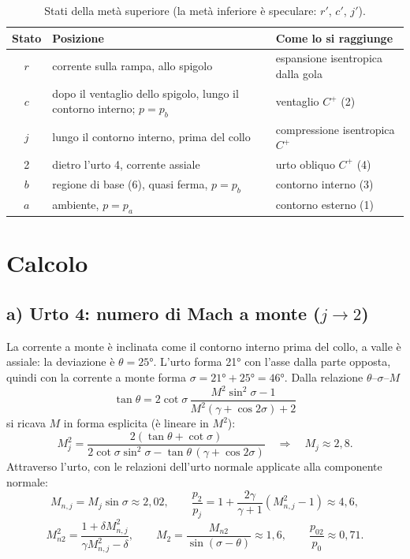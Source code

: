 \documentclass[11pt,a4paper]{article}
\newcommand{\Cp}{C^{+}}
\begin{document}
\begin{table}[H]
  \centering
  \small
  \begin{tabular}{cp{6.6cm}p{5.4cm}}
    \toprule
    Stato & Posizione & Come lo si raggiunge \\
    \midrule
    $r$ & corrente sulla rampa, allo spigolo & espansione isentropica dalla gola \\
    $c$ & dopo il ventaglio dello spigolo, lungo il contorno interno; $p=p_b$ & ventaglio $\Cp$ (2) \\
    $j$ & lungo il contorno interno, prima del collo & compressione isentropica $\Cp$ \\
    2 & dietro l'urto 4, corrente assiale & urto obliquo $\Cp$ (4) \\
    $b$ & regione di base (6), quasi ferma, $p=p_b$ & contorno interno (3) \\
    $a$ & ambiente, $p=p_a$ & contorno esterno (1) \\
    \bottomrule
  \end{tabular}
  \caption{Stati della metà superiore (la metà inferiore è speculare: $r'$, $c'$, $j'$).}
\end{table}

\section{Calcolo}

\subsection*{a) Urto 4: numero di Mach a monte ($j\to2$)}
La corrente a monte è inclinata come il contorno interno prima del collo, a valle è assiale: la deviazione è
$\theta=\ang{25}$. L'urto forma \ang{21} con l'asse dalla parte opposta, quindi con la corrente a monte forma
$\sigma=\ang{21}+\ang{25}=\ang{46}$. Dalla relazione $\theta$--$\sigma$--$M$
\[
\tan\theta=2\cot\sigma\,\frac{M^2\sin^2\sigma-1}{M^2(\gamma+\cos2\sigma)+2}
\]
si ricava $M$ in forma esplicita (è lineare in $M^2$):
\[
M_j^2=\frac{2(\tan\theta+\cot\sigma)}{2\cot\sigma\sin^2\sigma-\tan\theta\,(\gamma+\cos2\sigma)}
\quad\Rightarrow\quad M_j\approx2{,}8 .
\]
Attraverso l'urto, con le relazioni dell'urto normale applicate alla componente normale:
\[
M_{n,j}=M_j\sin\sigma\approx2{,}02,\qquad
\frac{p_2}{p_j}=1+\frac{2\gamma}{\gamma+1}\left(M_{n,j}^2-1\right)\approx4{,}6,
\]
\[
M_{n2}^2=\frac{1+\delta M_{n,j}^2}{\gamma M_{n,j}^2-\delta},\qquad
M_2=\frac{M_{n2}}{\sin(\sigma-\theta)}\approx1{,}6,\qquad \frac{p_{02}}{p_{0}}\approx0{,}71 .
\]
\end{document}
